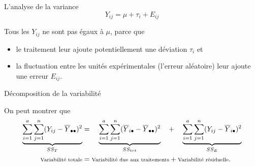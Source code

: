 \documentclass{BeamerTemplate}
\begin{document}
\begin{frame}[t]{L'analyse de la variance}
 $$Y_{ij}=\mu+\tau_i+E_{ij}$$

 Tous les $Y_{ij}$ ne sont pas égaux à $\mu$, parce que
\begin{itemize}
\item[(i)] le traitement leur ajoute potentiellement une déviation $\tau_i$ et
\item[(ii)] la fluctuation entre les unités expérimentales (l'erreur
aléatoire) leur ajoute une erreur $E_{ij}$.
\end{itemize}

\medskip
{}
\end{frame}

\begin{frame}[t]{Décomposition de la variabilité}

{\small
On peut montrer que
\begin{align*}
\underbrace{\sum_{i=1}^a\sum_{j=1}^n(Y_{ij}-\overline{Y}_{\bullet\bullet})^2}_{SS_T}
&=\quad
\underbrace{\sum_{i=1}^a\sum_{j=1}^n(\overline{Y}_{i\bullet}-\overline{Y}_{\bullet\bullet})^2}_{SS_{trt}}\quad+\quad
\underbrace{\sum_{i=1}^a\sum_{j=1}^n(Y_{ij}-\overline{Y}_{i\bullet})^2}_{SS_E}\\
\mbox{{\scriptsize Variabilité totale}} &=
\mbox{{\scriptsize Variabilité due aux traitements}} +
\mbox{{\scriptsize Variabilité résiduelle}}.
\end{align*}

}
\end{frame}
\end{document}
